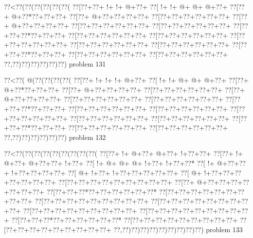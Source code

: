 \vbox{\vbox{\goo
\0??<\0??(\0??(\0??(\0??(\0??(\0??(
\0??[\0??+\0??+\- !+\- !+\- @+\0??+
\0??[\- !+\- !+\- @+\- @+\- @+\0??+
\0??[\0??+\- @+\0??*\0??+\0??+\0??+
\0??[\0??+\- @+\0??+\0??+\0??+\0??+
\0??[\0??+\0??+\0??+\0??+\0??+\0??+
\0??[\0??+\- @+\0??+\0??+\0??+\0??+
\0??[\0??+\0??+\0??+\0??+\0??+\0??+
\0??[\0??+\0??+\0??+\0??+\0??+\0??+
\0??[\0??+\0??+\0??*\0??+\0??+\0??+
\0??[\0??+\0??+\0??+\0??+\0??+\0??+
\0??[\0??+\0??+\0??+\0??+\0??+\0??+
\0??[\0??+\0??+\0??+\0??+\0??+\0??+
\0??[\0??+\0??+\0??+\0??+\0??+\0??+
\0??[\0??+\0??+\0??+\0??+\0??+\0??+
\0??[\0??+\0??+\0??*\0??+\0??+\0??+
\0??[\0??+\0??+\0??+\0??+\0??+\0??+
\0??[\0??+\0??+\0??+\0??+\0??+\0??+
\0??,\0??)\0??)\0??)\0??)\0??)\0??)
}
\hfil problem 131\hfil\break
}

\vbox{\vbox{\goo
\0??<\0??(\- @(\0??(\0??(\0??(\0??(
\0??[\0??+\- !+\- !+\- !+\- @+\0??+
\0??[\- !+\- !+\- @+\- @+\- @+\0??+
\0??[\0??+\- @+\0??*\0??+\0??+\0??+
\0??[\0??+\- @+\0??+\0??+\0??+\0??+
\0??[\0??+\0??+\0??+\0??+\0??+\0??+
\0??[\0??+\- @+\0??+\0??+\0??+\0??+
\0??[\0??+\0??+\0??+\0??+\0??+\0??+
\0??[\0??+\0??+\0??+\0??+\0??+\0??+
\0??[\0??+\0??+\0??*\0??+\0??+\0??+
\0??[\0??+\0??+\0??+\0??+\0??+\0??+
\0??[\0??+\0??+\0??+\0??+\0??+\0??+
\0??[\0??+\0??+\0??+\0??+\0??+\0??+
\0??[\0??+\0??+\0??+\0??+\0??+\0??+
\0??[\0??+\0??+\0??+\0??+\0??+\0??+
\0??[\0??+\0??+\0??*\0??+\0??+\0??+
\0??[\0??+\0??+\0??+\0??+\0??+\0??+
\0??[\0??+\0??+\0??+\0??+\0??+\0??+
\0??,\0??)\0??)\0??)\0??)\0??)\0??)
}
\hfil problem 132\hfil\break
}

\vbox{\vbox{\goo
\0??<\0??(\0??(\0??(\0??(\0??(\0??(\0??(\0??(\0??(
\0??[\0??+\- !+\- @+\0??+\- @+\0??+\- !+\0??+\0??+
\0??[\0??+\- !+\- @+\0??+\- @+\0??+\0??+\- !+\0??+
\0??[\- !+\- @+\- @+\- @+\- !+\0??+\- !+\0??+\0??*
\0??[\- !+\- @+\0??+\0??+\- !+\0??+\0??+\0??+\0??+
\0??[\- @+\- !+\0??+\- !+\0??+\0??+\0??+\0??+\0??+
\0??[\- @+\- !+\0??+\0??+\0??+\0??+\0??+\0??+\0??+
\0??[\0??+\0??+\0??+\0??+\0??+\0??+\0??+\0??+\0??+
\0??[\0??+\- @+\0??+\0??+\0??+\0??+\0??+\0??+\0??+
\0??[\0??+\0??+\0??*\0??+\0??+\0??+\0??+\0??+\0??*
\0??[\0??+\0??+\0??+\0??+\0??+\0??+\0??+\0??+\0??+
\0??[\0??+\0??+\0??+\0??+\0??+\0??+\0??+\0??+\0??+
\0??[\0??+\0??+\0??+\0??+\0??+\0??+\0??+\0??+\0??+
\0??[\0??+\0??+\0??+\0??+\0??+\0??+\0??+\0??+\0??+
\0??[\0??+\0??+\0??+\0??+\0??+\0??+\0??+\0??+\0??+
\0??[\0??+\0??+\0??*\0??+\0??+\0??+\0??+\0??+\0??*
\0??[\0??+\0??+\0??+\0??+\0??+\0??+\0??+\0??+\0??+
\0??[\0??+\0??+\0??+\0??+\0??+\0??+\0??+\0??+\0??+
\0??,\0??)\0??)\0??)\0??)\0??)\0??)\0??)\0??)\0??)
}
\hfil problem 133\hfil\break
}

